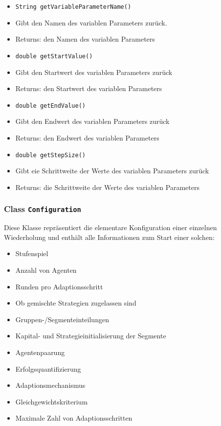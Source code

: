 \documentclass[parskip=full,11pt]{scrartcl}
\begin{document}
\begin{itemize}
	\item \texttt{String getVariableParameterName()}
	\item[] Gibt den Namen des variablen Parameters zurück.
	\item[] Returns: den Namen des variablen Parameters
	
	\item \texttt{double getStartValue()}
	\item[] Gibt den Startwert des variablen Parameters zurück
	\item[] Returns: den Startwert des variablen Parameters
	
	\item \texttt{double getEndValue()}
	\item[] Gibt den Endwert des variablen Parameters zurück
	\item[] Returns: den Endwert des variablen Parameters
	
	\item \texttt{double getStepSize()}
	\item[] Gibt eie Schrittweite der Werte des variablen Parameters zurück
	\item[] Returns: die Schrittweite der Werte des variablen Parameters
	
	
\end{itemize}


\subsubsection{Class \texttt{Configuration}}
Diese Klasse repräsentiert die elementare Konfiguration einer einzelnen Wiederholung und enthält alle Informationen zum Start einer solchen:
\begin{itemize}\itemsep -10pt
\item Stufenspiel
\item Anzahl von Agenten
\item Runden pro Adaptionsschritt
\item Ob gemischte Strategien zugelassen sind
\item Gruppen-/Segmenteinteilungen
\item Kapital- und Strategieinitialisierung der Segmente
\item Agentenpaarung
\item Erfolgsquantifizierung
\item Adaptionsmechanismus
\item Gleichgewichtskriterium
\item Maximale Zahl von Adaptionsschritten
\end{itemize}
\end{document}
